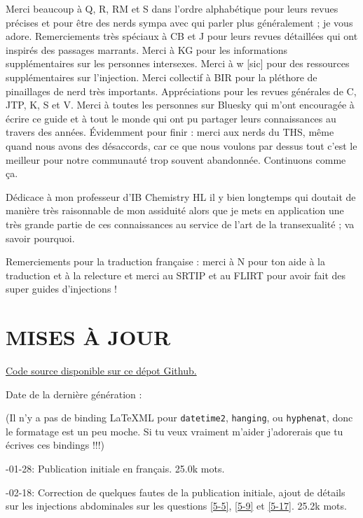 \documentclass{article}
\begin{document}
Merci beaucoup à Q, R, RM et S dans l'ordre alphabétique pour leurs revues précises et pour être des nerds sympa avec qui parler plus généralement ; je vous adore. Remerciements très spéciaux à CB et J pour leurs revues détaillées qui ont inspirés des passages marrants. Merci à KG pour les informations supplémentaires sur les personnes intersexes. Merci à w [sic] pour des ressources supplémentaires sur l'injection. Merci collectif à BIR pour la pléthore de pinaillages de nerd très importants. Appréciations pour les revues générales de C, JTP, K, S et V. Merci à toutes les personnes sur Bluesky qui m'ont encouragée à écrire ce guide et à tout le monde qui ont pu partager leurs connaissances au travers des années. Évidemment pour finir : merci aux nerds du THS, même quand nous avons des désaccords, car ce que nous voulons par dessus tout c'est le meilleur pour notre communauté trop souvent abandonnée. Continuons comme ça.

Dédicace à mon professeur d'IB Chemistry HL il y bien longtemps qui doutait de manière très raisonnable de mon assiduité alors que je mets en application une très grande partie de ces connaissances au service de l'art de la transexualité ; va savoir pourquoi.

Remerciements pour la traduction française : merci à N pour ton aide à la traduction et à la relecture et merci au SRTIP et au FLIRT pour avoir fait des super guides d'injections !

\section*{MISES À JOUR}

\noindent \href{https://github.com/Juicysteak117/pghrt/}{Code source disponible sur ce dépot Github.}

\noindent Date de la dernière génération : \DTMnow

\noindent(Il n'y a pas de binding LaTeXML pour \texttt{datetime2}, \texttt{hanging}, ou \texttt{hyphenat}, donc le formatage est un peu moche. Si tu veux vraiment m'aider j'adorerais que tu écrives ces bindings !!!)

-01-28: Publication initiale en français. 25.0k mots.

-02-18: Correction de quelques fautes de la publication initiale, ajout de détails sur les injections abdominales sur les questions \ref{5-5}, \ref{5-9} et \ref{5-17}. 25.2k mots.
\end{document}
